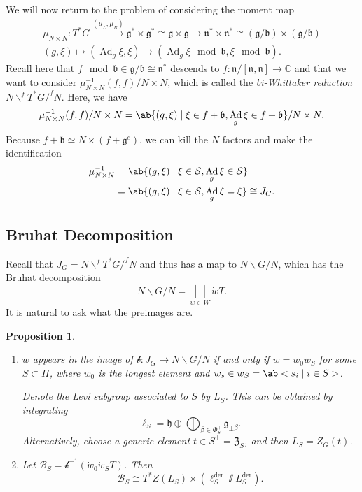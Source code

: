 \documentclass{amsart}
\newtheorem{prop}[thm]{Proposition}
\theoremstyle{definition}
\theoremstyle{remark}
\theoremstyle{plain}
\theoremstyle{definition}
\theoremstyle{remark}
\newcommand{\C}{\mathbb{C}}
\newcommand{\g}{\mathfrak{g}}
\newcommand{\h}{\mathfrak{h}}
\newcommand{\n}{\mathfrak{n}}
\renewcommand{\b}{\mathfrak{b}}
\newcommand{\mc}[1]{\mathcal{#1}}
\newcommand{\mf}[1]{\mathfrak{#1}}
\newcommand{\on}[1]{\operatorname{#1}}
\newcommand{\1}{\mathbf{1}}
\newcommand{\2}{\mathbf{2}}
\newcommand{\3}{\mathbf{3}}
\DeclareMathOperator{\Ad}{Ad}
\begin{document}
We will now return to the problem of considering the moment map
\begin{align*}
    \mu_{N \times N} \colon T^* G \xrightarrow{(\mu_L, \mu_R)} \g^* \times \g^* \cong \g \times \g \to \n^* \times \n^* \cong (\g/\b) \times (\g/\b) \\
    (g, \xi) \mapsto (\Ad_g \xi, \xi) \mapsto (\Ad_g \xi \mod{\b}, \xi \mod{\b}).
\end{align*}
Recall here that \(f \mod{\b} \in \g/\b \cong \n^*\) descends to \(f \colon \n/[\n, \n] \to \C\) and that we want to consider \(\mu_{N \times N}^{-1}(f,f) / N \times N\), which is called the \textit{bi-Whittaker reduction} \(N \backslash^f T^* G /^f N\). Here, we have
\[ \mu_{N \times N}^{-1}(f,f)/N \times N = \ab\{ (g, \xi) \mid \xi \in f + \b, \Ad_g \xi \in f + \b \} / N \times N. \]
Because \(f + \b \simeq N \times (f + \g^e)\), we can kill the \(N\) factors and make the identification
\begin{align*}
    \mu_{N \times N}^{-1} &= \ab\{ (g, \xi) \mid \xi \in \mc{S}, \Ad_g \xi \in \mc{S} \} \\
    &= \ab\{ (g, \xi) \mid \xi \in \mc{S}, \Ad_g \xi = \xi \} \cong J_G.
\end{align*}

\subsection{Bruhat Decomposition}%
\label{sub:Bruhat Decomposition}

Recall that \(J_G = N \backslash^f T^* G /^f N\) and thus has a map to \(N \backslash G / N\), which has the Bruhat decomposition
\[ N \backslash G / N = \bigsqcup_{w \in W} \dot{w} T. \]
It is natural to ask what the preimages are.

\begin{prop}\leavevmode
    \begin{enumerate}
        \item \(w\) appears in the image of \(\mc{b} \colon J_G \to N \backslash G / N\) if and only if \(w = w_0 w_S\) for some \(S \subset \Pi\), where \(w_0\) is the longest element and \(w_s \in w_S = \ab< s_i \mid i \in S>\).
        
        Denote the Levi subgroup associated to \(S\) by \(L_S\). This can be obtained by integrating
        \[ \ell_S = \h \oplus \bigoplus_{\beta \in \Phi_S^+} \g_{\pm \beta}. \]
        Alternatively, choose a generic element \(t \in S^{\perp} = \mf{Z}_S\), and then \(L_S = Z_G(t)\).
        \item Let \(\mc{B}_S = \mc{b}^{-1}(\dot{w}_0 \dot{w}_S T)\). Then 
        \[ \mc{B}_S \cong T^* Z(L_S) \times (\ell_S^{\on{der}} \sslash L_S^{\on{der}}). \]
    \end{enumerate}    
\end{prop}
\end{document}
